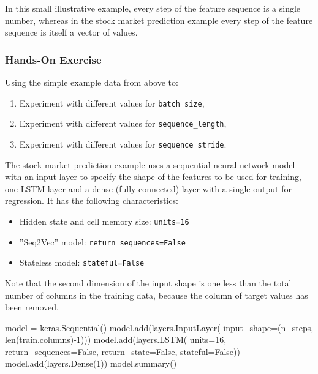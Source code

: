 In this small illustrative example, every step of the feature sequence is a single number, whereas in the stock market prediction example every step of the feature sequence is itself a vector of values.


\begin{tcolorbox}[colback=code]
\subsubsection*{Hands-On Exercise} 
Using the simple example data from above to:
\begin{enumerate}
   \item Experiment with different values for \texttt{batch\_size},
   \item Experiment with different values for \texttt{sequence\_length},
   \item Experiment with different values for \texttt{sequence\_stride}.
\end{enumerate}
\end{tcolorbox}

The stock market prediction example uses a sequential neural network model with an input layer to specify the shape of the features to be used for training, one LSTM layer and a dense (fully-connected) layer with a single output for regression. It has the following characteristics:

\begin{itemize}
   \item Hidden state and cell memory size: \texttt{units=16}
   \item ''Seq2Vec'' model: \texttt{return\_sequences=False}
   \item Stateless model: \texttt{stateful=False}
\end{itemize}

Note that the second dimension of the input shape is one less than the total number of columns in the training data, because the column of target values has been removed.

\begin{samepage}
\begin{pythoncode}
model = keras.Sequential()
model.add(layers.InputLayer(
    input_shape=(n_steps, len(train.columns)-1)))
model.add(layers.LSTM(
    units=16,
    return_sequences=False,
    return_state=False,
    stateful=False))
model.add(layers.Dense(1))
model.summary()
\end{pythoncode}
\end{samepage}

